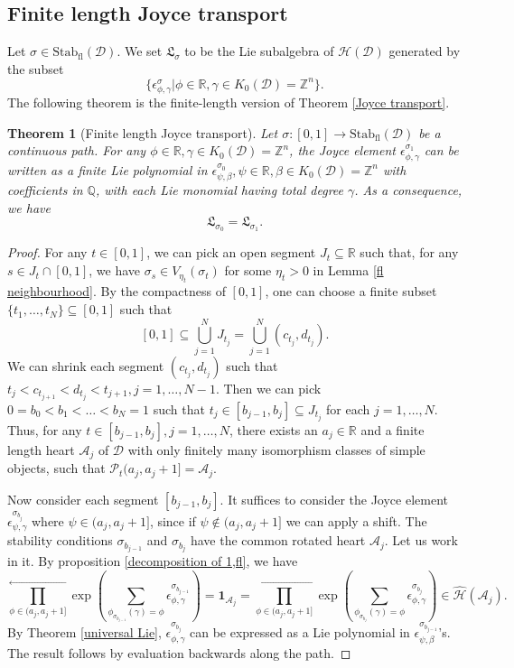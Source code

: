 \documentclass[a4paper,12pt]{amsart}
\numberwithin{equation}{section}
\newtheorem{theorem}{Theorem}[section]
\newcommand{\Stab}{\mathrm{Stab}}
\newcommand{\1}{\mathbf{1}}
\newcommand{\fl}{\mathrm{fl}}
\begin{document}
\subsection{Finite length Joyce transport}
Let $\sigma\in\Stab_\fl(\mathcal{D})$. We set $\mathfrak{L}_\sigma$ to be the Lie subalgebra of $\mathcal{H}(\mathcal{D})$ generated by the subset
\[\{\epsilon^\sigma_{\phi,\gamma}|\phi\in\mathbb{R},\gamma\in K_0(\mathcal{D})=\mathbb{Z}^n\}.\]
The following theorem is the finite-length version of Theorem \ref{Joyce transport}.
\begin{theorem}[Finite length Joyce transport]\label{finite length Joyce transport}
    Let $\sigma:[0,1]\rightarrow\Stab_\fl(\mathcal{D})$ be a continuous path. For any $\phi\in\mathbb{R},\gamma\in K_0(\mathcal{D})=\mathbb{Z}^n$, the Joyce element $\epsilon^{\sigma_1}_{\phi,\gamma}$ can be written as a finite Lie polynomial in $\epsilon^{\sigma_0}_{\psi,\beta},\psi\in\mathbb{R},\beta\in K_0(\mathcal{D})=\mathbb{Z}^n$ with coefficients in $\mathbb{Q}$, with each Lie monomial having total degree $\gamma$. As a consequence, we have
    \[\mathfrak{L}_{\sigma_0}=\mathfrak{L}_{\sigma_1}.\]
\end{theorem}
\begin{proof}
    For any $t\in[0,1]$, we can pick an open segment $J_t\subseteq\mathbb{R}$ such that, for any $s\in J_t\cap[0,1]$, we have $\sigma_s\in V_{\eta_t}(\sigma_t)$ for some $\eta_t>0$ in Lemma \ref{fl neighbourhood}.
    By the compactness of $[0,1]$, one can choose a finite subset $\{t_1,\dots,t_N\}\subseteq[0,1]$ such that
    \[[0,1]\subseteq\bigcup_{j=1}^N J_{t_j}=\bigcup_{j=1}^N(c_{t_j},d_{t_j}).\]
    We can shrink each segment $(c_{t_j},d_{t_j})$ such that $t_j<c_{t_{j+1}}<d_{t_j}<t_{j+1},j=1,\dots,N-1$. Then we can pick $0=b_0<b_1<\dots<b_N=1$ such that $t_j\in[b_{j-1},b_j]\subseteq J_{t_j}$ for each $j=1,\dots,N$. Thus, for any $t\in[b_{j-1},b_j],j=1,\dots,N$, there exists an $a_j\in\mathbb{R}$ and a finite length heart $\mathcal{A}_j$ of $\mathcal{D}$ with only finitely many isomorphism classes of simple objects, such that $\mathcal{P}_t(a_j,a_j+1]=\mathcal{A}_j$.

    Now consider each segment $[b_{j-1},b_j]$. It suffices to consider the Joyce element $\epsilon^{\sigma_{b_j}}_{\psi,\gamma}$ where $\psi\in(a_j,a_j+1]$, since if $\psi\notin(a_j,a_j+1]$ we can apply a shift. The stability conditions $\sigma_{b_{j-1}}$ and $\sigma_{b_j}$ have the common rotated heart $\mathcal{A}_j$. Let us work in it. By proposition \ref{decomposition of 1,fl}, we have
    \[\prod_{\phi\in(a_j,a_j+1]}^\leftarrow\exp\left(\sum_{\phi_{\sigma_{b_{j-1}}}(\gamma)=\phi}\epsilon^{\sigma_{b_{j-1}}}_{\phi,\gamma}\right)=\1_{\mathcal{A}_j}=\prod_{\phi\in(a_j,a_j+1]}^\leftarrow\exp\left(\sum_{\phi_{\sigma_{b_j}}(\gamma)=\phi}\epsilon^{\sigma_{b_j}}_{\phi,\gamma}\right)\in\hat{\mathcal{H}}(\mathcal{A}_j).\]
    By Theorem \ref{universal Lie}, $\epsilon^{\sigma_{b_j}}_{\phi,\gamma}$ can be expressed as a Lie polynomial in $\epsilon^{\sigma_{b_{j-1}}}_{\psi,\beta}$'s. The result follows by evaluation backwards along the path.
\end{proof}
\end{document}
